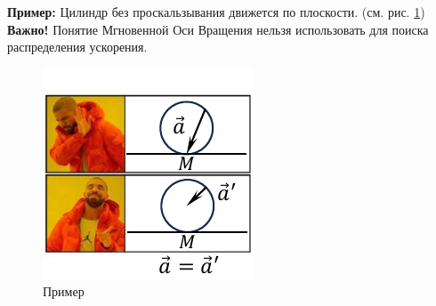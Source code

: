 \textbf{Пример:} Цилиндр без проскальзывания движется по плоскости. (см. рис. \ref{fig:7}) \textbf{Важно!} Понятие Мгновенной Оси Вращения нельзя использовать для поиска распределения ускорения.
\begin{figure}[H]
	\centering
	\includegraphics[width=0.6\linewidth]{"image/Кинематика Плоского Движения 3"}
	\caption{Пример}
	\label{fig:7}
\end{figure}


